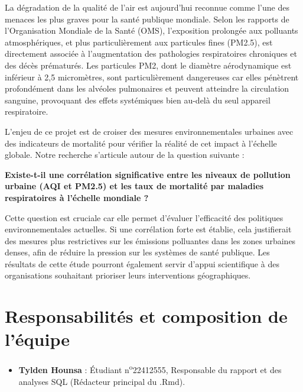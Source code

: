 \documentclass[mstat,12pt]{unswthesis}
\begin{document}
La dégradation de la qualité de l'air est aujourd'hui reconnue comme
l'une des menaces les plus graves pour la santé publique mondiale. Selon
les rapports de l'Organisation Mondiale de la Santé (OMS), l'exposition
prolongée aux polluants atmosphériques, et plus particulièrement aux
particules fines (PM2.5), est directement associée à l'augmentation des
pathologies respiratoires chroniques et des décès prématurés. Les
particules PM2, dont le diamètre aérodynamique est inférieur à 2,5
micromètres, sont particulièrement dangereuses car elles pénètrent
profondément dans les alvéoles pulmonaires et peuvent atteindre la
circulation sanguine, provoquant des effets systémiques bien au-delà du
seul appareil respiratoire.

L'enjeu de ce projet est de croiser des mesures environnementales
urbaines avec des indicateurs de mortalité pour vérifier la réalité de
cet impact à l'échelle globale. Notre recherche s'articule autour de la
question suivante :

\bigskip

\begin{center}
\textbf{Existe-t-il une corrélation significative entre les niveaux de pollution urbaine (AQI et PM2.5) et les taux de mortalité par maladies respiratoires à l'échelle mondiale ?}
\end{center}
\medskip
\justifying

Cette question est cruciale car elle permet d'évaluer l'efficacité des
politiques environnementales actuelles. Si une corrélation forte est
établie, cela justifierait des mesures plus restrictives sur les
émissions polluantes dans les zones urbaines denses, afin de réduire la
pression sur les systèmes de santé publique. Les résultats de cette
étude pourront également servir d'appui scientifique à des organisations
souhaitant prioriser leurs interventions géographiques.

\section{Responsabilités et composition de
l'équipe}\label{responsabilituxe9s-et-composition-de-luxe9quipe}

\medskip

\begin{itemize}
\tightlist
\item
  \textbf{Tylden Hounsa} : Étudiant n\textsuperscript{o}22412555,
  Responsable du rapport et des analyses SQL (Rédacteur principal du
  .Rmd).
\end{itemize}
\end{document}

